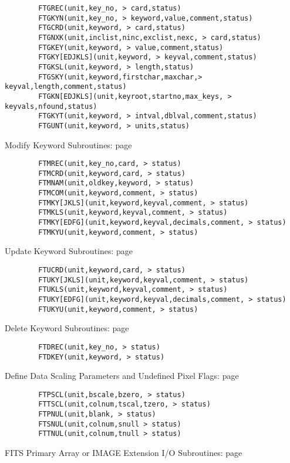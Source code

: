 \documentclass[11pt]{book}
\begin{document}
\begin{verbatim}
        FTGREC(unit,key_no, > card,status)
        FTGKYN(unit,key_no, > keyword,value,comment,status)
        FTGCRD(unit,keyword, > card,status)
        FTGNXK(unit,inclist,ninc,exclist,nexc, > card,status)
        FTGKEY(unit,keyword, > value,comment,status)
        FTGKY[EDJKLS](unit,keyword, > keyval,comment,status)
        FTGKSL(unit,keyword, > length,status)
        FTGSKY(unit,keyword,firstchar,maxchar,> keyval,length,comment,status)
        FTGKN[EDJKLS](unit,keyroot,startno,max_keys, > keyvals,nfound,status)
        FTGKYT(unit,keyword, > intval,dblval,comment,status)
        FTGUNT(unit,keyword, > units,status)
\end{verbatim}
 Modify Keyword Subroutines: page~\pageref{FTMREC}

\begin{verbatim}
        FTMREC(unit,key_no,card, > status)
        FTMCRD(unit,keyword,card, > status)
        FTMNAM(unit,oldkey,keyword, > status)
        FTMCOM(unit,keyword,comment, > status)
        FTMKY[JKLS](unit,keyword,keyval,comment, > status)
        FTMKLS(unit,keyword,keyval,comment, > status)
        FTMKY[EDFG](unit,keyword,keyval,decimals,comment, > status)
        FTMKYU(unit,keyword,comment, > status)
\end{verbatim}
 Update Keyword Subroutines: page~\pageref{FTUCRD}

\begin{verbatim}
        FTUCRD(unit,keyword,card, > status)
        FTUKY[JKLS](unit,keyword,keyval,comment, > status)
        FTUKLS(unit,keyword,keyval,comment, > status)
        FTUKY[EDFG](unit,keyword,keyval,decimals,comment, > status)
        FTUKYU(unit,keyword,comment, > status)
\end{verbatim}
 Delete Keyword Subroutines: page~\pageref{FTDREC}

\begin{verbatim}
        FTDREC(unit,key_no, > status)
        FTDKEY(unit,keyword, > status)
\end{verbatim}
 Define Data Scaling Parameters and Undefined Pixel Flags: page~\pageref{FTPSCL}

\begin{verbatim}
        FTPSCL(unit,bscale,bzero, > status)
        FTTSCL(unit,colnum,tscal,tzero, > status)
        FTPNUL(unit,blank, > status)
        FTSNUL(unit,colnum,snull > status)
        FTTNUL(unit,colnum,tnull > status)
\end{verbatim}
 FITS Primary Array or IMAGE Extension I/O Subroutines: page~\pageref{FTPPR}
\end{document}

